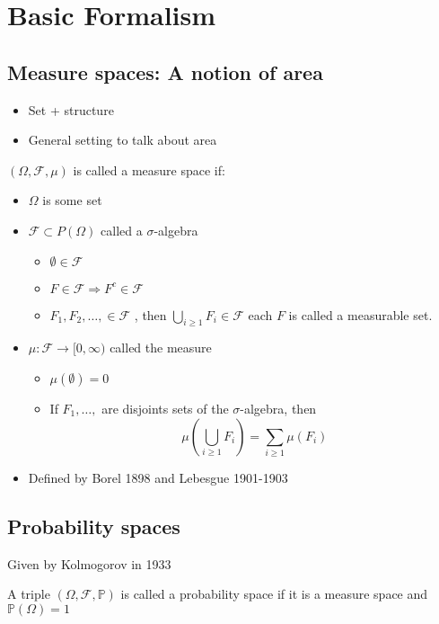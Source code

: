 \documentclass[../main.tex]{subfiles}
\begin{document}
\section{Basic Formalism}
\subsection{Measure spaces: A notion of area}
\begin{itemize}
\item Set + structure
\item General setting to talk about area
\end{itemize}
\begin{defn}
	$ ( \Omega, \mathcal{F}, \mu) $ is called a measure space if:
	\begin{itemize}
	\item $\Omega$ is some set
	\item $ \mathcal{F} \subset P( \Omega) $ called a $\sigma$-algebra
		\begin{itemize}
		\item $\emptyset \in \mathcal{F}$ 
		\item $F \in \mathcal{F} \Rightarrow F^{c}\in \mathcal{F}$ 
		\item $F_1,F_2, \ldots, \in \mathcal{F}$ , then $\bigcup_{i \geq 1} F_i \in \mathcal{F}$ each $F$ is called a measurable set.	
		\end{itemize}
	
	\item $\mu: \mathcal{F}\to [ 0, \infty ) $ called the measure
		\begin{itemize}
			\item $\mu( \emptyset) =0$ 
			\item If $F_1, \ldots, $ are disjoints sets of the $\sigma$-algebra, then
				\[ 
					\mu( \bigcup_{i\geq 1} F_i) = \sum_{i \geq 1} \mu( F_i) 
				\]
				
		\end{itemize}

	\item Defined by Borel 1898 and Lebesgue 1901-1903
			
	\end{itemize}

	
\end{defn}
\subsection{Probability spaces}
Given by Kolmogorov in 1933
\begin{defn}
	A triple $( \Omega, \mathcal{F}, \mathbb{P}) $ is called a probability space if it is a measure space and $\mathbb{P}( \Omega) =1$ 
\end{defn}
\end{document}
